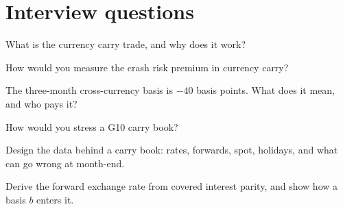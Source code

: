 \section{Interview questions}

\begin{interviewq}\label{iq:s2:cross-currency-basis-and-fx-carry:1}
What is the currency carry trade, and why does it work?
\end{interviewq}

\begin{interviewq}\label{iq:s2:cross-currency-basis-and-fx-carry:2}
How would you measure the crash risk premium in currency carry?
\end{interviewq}

\begin{interviewq}\label{iq:s2:cross-currency-basis-and-fx-carry:3}
The three-month cross-currency basis is $-40$ basis points. What does it mean, and who pays it?
\end{interviewq}

\begin{interviewq}\label{iq:s2:cross-currency-basis-and-fx-carry:4}
How would you stress a G10 carry book?
\end{interviewq}

\begin{interviewq}\label{iq:s2:cross-currency-basis-and-fx-carry:5}
Design the data behind a carry book: rates, forwards, spot, holidays, and what can go wrong at month-end.
\end{interviewq}

\begin{interviewq}\label{iq:s2:cross-currency-basis-and-fx-carry:6}
Derive the forward exchange rate from covered interest parity, and show how a basis $b$ enters it.
\end{interviewq}
